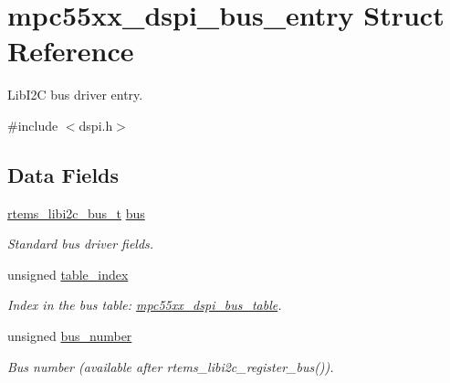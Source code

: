 \hypertarget{structmpc55xx__dspi__bus__entry}{}\section{mpc55xx\+\_\+dspi\+\_\+bus\+\_\+entry Struct Reference}
\label{structmpc55xx__dspi__bus__entry}


Lib\+I2C bus driver entry.  




{\ttfamily \#include $<$dspi.\+h$>$}

\subsection*{Data Fields}
\begin{DoxyCompactItemize}
\item 
\mbox{\label{structmpc55xx__dspi__bus__entry_a4c4a0dbd70fb267af1678d0e99a5acc0}} 
\mbox{\hyperlink{structrtems__libi2c__bus__t__}{rtems\+\_\+libi2c\+\_\+bus\+\_\+t}} \mbox{\hyperlink{structmpc55xx__dspi__bus__entry_a4c4a0dbd70fb267af1678d0e99a5acc0}{bus}}
\begin{DoxyCompactList}\small\item\em Standard bus driver fields. \end{DoxyCompactList}\item 
\mbox{\label{structmpc55xx__dspi__bus__entry_a7deba99f4917fa316ec5b82743133567}} 
unsigned \mbox{\hyperlink{structmpc55xx__dspi__bus__entry_a7deba99f4917fa316ec5b82743133567}{table\+\_\+index}}
\begin{DoxyCompactList}\small\item\em Index in the bus table\+: \mbox{\hyperlink{dspi_8h_a20a64412e03d3afd2dd736baa107e694}{mpc55xx\+\_\+dspi\+\_\+bus\+\_\+table}}. \end{DoxyCompactList}\item 
unsigned \mbox{\hyperlink{structmpc55xx__dspi__bus__entry_a93dade46628816c971b2c1ca60314e7e}{bus\+\_\+number}}
\begin{DoxyCompactList}\small\item\em Bus number (available after rtems\+\_\+libi2c\+\_\+register\+\_\+bus()). \end{DoxyCompactList}\item 
\mbox{\label{structmpc55xx__dspi__bus__entry_a357141a4e1a59a98148a6975bcdecef1}} 

\end{DoxyCompactItemize}
